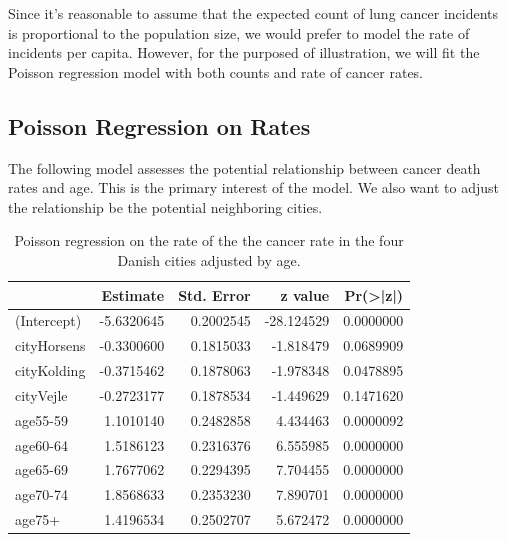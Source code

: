 \documentclass[
]{book}
\newenvironment{Shaded}{\begin{snugshade}}{\end{snugshade}}
\newcommand{\AttributeTok}[1]{\textcolor[rgb]{0.13,0.29,0.53}{#1}}
\newcommand{\FunctionTok}[1]{\textcolor[rgb]{0.13,0.29,0.53}{\textbf{#1}}}
\newcommand{\NormalTok}[1]{#1}
\newcommand{\OtherTok}[1]{\textcolor[rgb]{0.56,0.35,0.01}{#1}}
\newcommand{\SpecialCharTok}[1]{\textcolor[rgb]{0.81,0.36,0.00}{\textbf{#1}}}
\newcommand{\StringTok}[1]{\textcolor[rgb]{0.31,0.60,0.02}{#1}}
\begin{document}
Since it's reasonable to assume that the expected count of lung cancer incidents is proportional to the population size, we would prefer to model the rate of incidents per capita. However, for the purposed of illustration, we will fit the Poisson regression model with both counts and rate of cancer rates.

\hypertarget{poisson-regression-on-rates}{%
\subsection{Poisson Regression on Rates}\label{poisson-regression-on-rates}}

The following model assesses the potential relationship between cancer death rates and age. This is the primary interest of the model. We also want to adjust the relationship be the potential neighboring cities.

\begin{Shaded}
\end{Shaded}

\begin{table}

\caption{\label{tab:unnamed-chunk-157}Poisson regression on the rate of the the cancer rate in the four Danish cities adjusted by age.}
\centering
\begin{tabular}[t]{l|r|r|r|r}
\hline
  & Estimate & Std. Error & z value & Pr(>|z|)\\
\hline
(Intercept) & -5.6320645 & 0.2002545 & -28.124529 & 0.0000000\\
\hline
cityHorsens & -0.3300600 & 0.1815033 & -1.818479 & 0.0689909\\
\hline
cityKolding & -0.3715462 & 0.1878063 & -1.978348 & 0.0478895\\
\hline
cityVejle & -0.2723177 & 0.1878534 & -1.449629 & 0.1471620\\
\hline
age55-59 & 1.1010140 & 0.2482858 & 4.434463 & 0.0000092\\
\hline
age60-64 & 1.5186123 & 0.2316376 & 6.555985 & 0.0000000\\
\hline
age65-69 & 1.7677062 & 0.2294395 & 7.704455 & 0.0000000\\
\hline
age70-74 & 1.8568633 & 0.2353230 & 7.890701 & 0.0000000\\
\hline
age75+ & 1.4196534 & 0.2502707 & 5.672472 & 0.0000000\\
\hline
\end{tabular}
\end{table}
\end{document}
